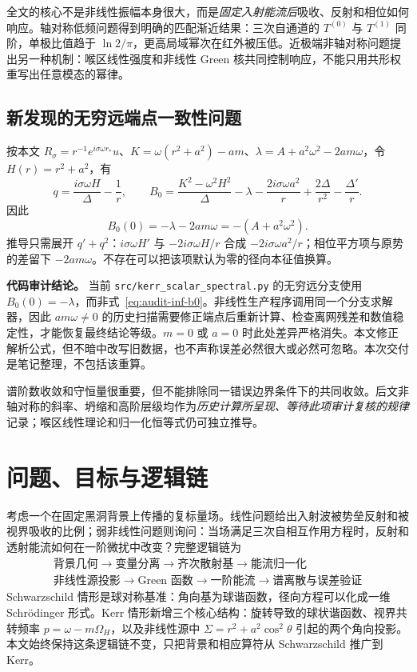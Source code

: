 \documentclass[UTF8,fontset=fandol,12pt,a4paper,oneside,openany]{ctexrep}
\begin{document}
全文的核心不是非线性振幅本身很大，而是\emph{固定入射能流后}吸收、反射和相位如何响应。轴对称低频问题得到明确的匹配渐近结果：三次自通道的 $T^{(0)}$ 与 $T^{(1)}$ 同阶，单极比值趋于 $\ln2/\pi$，更高局域幂次在红外被压低。近极端非轴对称问题提出另一种机制：喉区线性强度和非线性 Green 核共同控制响应，不能只用共形权重写出任意模态的幂律。

\subsection{新发现的无穷远端点一致性问题}
按本文 $R_\sigma=r^{-1}e^{i\sigma\omega r_*}u$、$K=\omega(r^2+a^2)-am$、$\lambda=A+a^2\omega^2-2am\omega$，令 $H(r)=r^2+a^2$，有
\begin{equation}
 q=\frac{i\sigma\omega H}{\Delta}-\frac1r,
 \qquad
 B_0=\frac{K^2-\omega^2H^2}{\Delta}-\lambda
       -\frac{2i\sigma\omega a^2}{r}
       +\frac{2\Delta}{r^2}-\frac{\Delta'}r.
\label{eq:audit-exact-b0}
\end{equation}
因此
\begin{equation}
 \boxed{B_0(0)=-\lambda-2am\omega=-(A+a^2\omega^2).}
\label{eq:audit-inf-b0}
\end{equation}
推导只需展开 $q'+q^2$：$i\sigma\omega H'$ 与 $-2i\sigma\omega H/r$ 合成 $-2i\sigma\omega a^2/r$；相位平方项与原势的差留下 $-2am\omega$。不存在可以把该项默认为零的径向本征值换算。

\begin{note}
\textbf{代码审计结论。} 当前 \texttt{src/kerr\_scalar\_spectral.py} 的无穷远分支使用 $B_0(0)=-\lambda$，而非式~\eqref{eq:audit-inf-b0}。非线性生产程序调用同一个分支求解器，因此 $am\omega\ne0$ 的历史扫描需要修正端点后重新计算、检查离网残差和数值稳定性，才能恢复最终结论等级。$m=0$ 或 $a=0$ 时此处差异严格消失。本文修正解析公式，但不暗中改写旧数据，也不声称误差必然很大或必然可忽略。本次交付是笔记整理，不包括该重算。
\end{note}
谱阶数收敛和守恒量很重要，但不能排除同一错误边界条件下的共同收敛。后文非轴对称的斜率、坍缩和高阶层级均作为\emph{历史计算所呈现、等待此项审计复核的规律}记录；喉区线性理论和归一化恒等式仍可独立推导。


\section{问题、目标与逻辑链}

考虑一个在固定黑洞背景上传播的复标量场。线性问题给出入射波被势垒反射和被视界吸收的比例；弱非线性问题则询问：当场满足三次自相互作用方程时，反射和透射能流如何在一阶微扰中改变？完整逻辑链为
\begin{equation}
\boxed{\begin{gathered}
\text{背景几何}\to\text{变量分离}\to\text{齐次散射基}
\to\text{能流归一化}\\
\text{非线性源投影}\to\text{Green 函数}\to\text{一阶能流}
\to\text{谱离散与误差验证}
\end{gathered}}
\end{equation}
Schwarzschild 情形是球对称基准：角向基为球谐函数，径向方程可以化成一维 Schr\"odinger 形式。Kerr 情形新增三个核心结构：旋转导致的球状谐函数、视界共转频率 $p=\omega-m\Omega_H$，以及非线性源中 $\Sigma=r^2+a^2\cos^2\theta$ 引起的两个角向投影。本文始终保持这条逻辑链不变，只把背景和相应算符从 Schwarzschild 推广到 Kerr。
\end{document}
